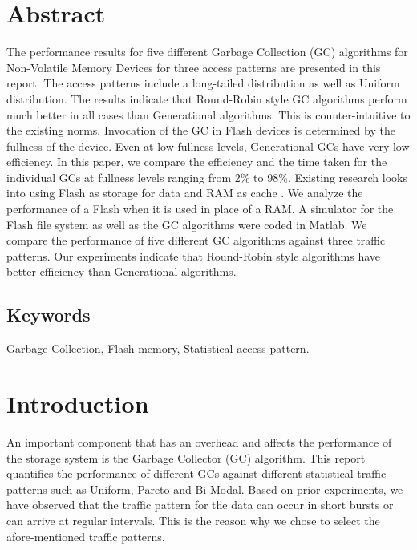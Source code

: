 \section{Abstract}
	The performance results for five different Garbage Collection (GC) algorithms for Non-Volatile Memory Devices for three access patterns are presented in this report. The access patterns include a long-tailed distribution as well as Uniform distribution. The results indicate that Round-Robin style GC algorithms perform much better in all cases than Generational algorithms. This is counter-intuitive to the existing norms. Invocation of the GC in Flash devices is determined by the fullness of the device. Even at low fullness levels, Generational GCs have very low efficiency. In this paper, we compare the efficiency and the time taken for the individual GCs at fullness levels ranging from 2\% to 98\%.  Existing research looks into using Flash as storage for data and RAM as cache \cite{Gupta09, Budilovsky11, Tjioe12}. We analyze the performance of a Flash when it is used in place of a RAM. A simulator for the Flash file system as well as the GC algorithms were coded in Matlab. We compare the performance of five different GC algorithms against three traffic patterns. Our experiments indicate that Round-Robin style algorithms have better efficiency than Generational algorithms.\\

\subsection*{Keywords}
	Garbage Collection, Flash memory, Statistical access pattern.

\section{Introduction}
		An important component that has an overhead and affects the performance of the storage system is the Garbage Collector (GC) algorithm. This report quantifies the performance of different GCs against different statistical traffic patterns such as Uniform, Pareto and Bi-Modal. Based on prior experiments, we have observed that the traffic pattern for the data can occur in short bursts or can arrive at regular intervals. This is the reason why we chose to select the afore-mentioned traffic patterns. \\

